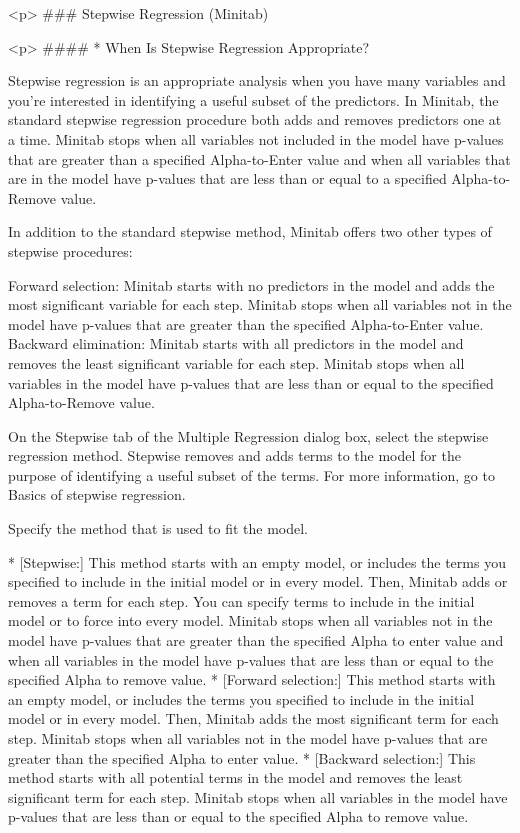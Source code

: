 <p>
### {Stepwise Regression (Minitab)}

<p>
####        * {When Is Stepwise Regression Appropriate?}

Stepwise regression is an appropriate analysis when you have many variables and you’re interested in identifying a useful subset of the predictors. In Minitab, the standard stepwise regression procedure both adds and removes predictors one at a time. Minitab stops when all variables not included in the model have p-values that are greater than a specified Alpha-to-Enter value and when all variables that are in the model have p-values that are less than or equal to a specified Alpha-to-Remove value.

In addition to the standard stepwise method, Minitab offers two other types of stepwise procedures:

Forward selection:  Minitab starts with no predictors in the model and adds the most significant variable for each step. Minitab stops when all variables not in the model have p-values that are greater than the specified Alpha-to-Enter value.
Backward elimination:  Minitab starts with all predictors in the model and removes the least significant variable for each step. Minitab stops when all variables in the model have p-values that are less than or equal to the specified Alpha-to-Remove value.


On the Stepwise tab of the Multiple Regression dialog box, select the stepwise regression method.
Stepwise removes and adds terms to the model for the purpose of identifying a useful subset of the terms. For more information, go to Basics of stepwise regression.

Specify the method that is used to fit the model.
 
	        * [Stepwise:] This method starts with an empty model, or includes the terms you specified to include in the initial model or in every model. Then, Minitab adds or removes a term for each step. You can specify terms to include in the initial model or to force into every model. Minitab stops when all variables not in the model have p-values that are greater than the specified Alpha to enter value and when all variables in the model have p-values that are less than or equal to the specified Alpha to remove value.
	        * [Forward selection:] This method starts with an empty model, or includes the terms you specified to include in the initial model or in every model. Then, Minitab adds the most significant term for each step. Minitab stops when all variables not in the model have p-values that are greater than the specified Alpha to enter value.
	        * [Backward selection:] This method starts with all potential terms in the model and removes the least significant term for each step. Minitab stops when all variables in the model have p-values that are less than or equal to the specified Alpha to remove value.


